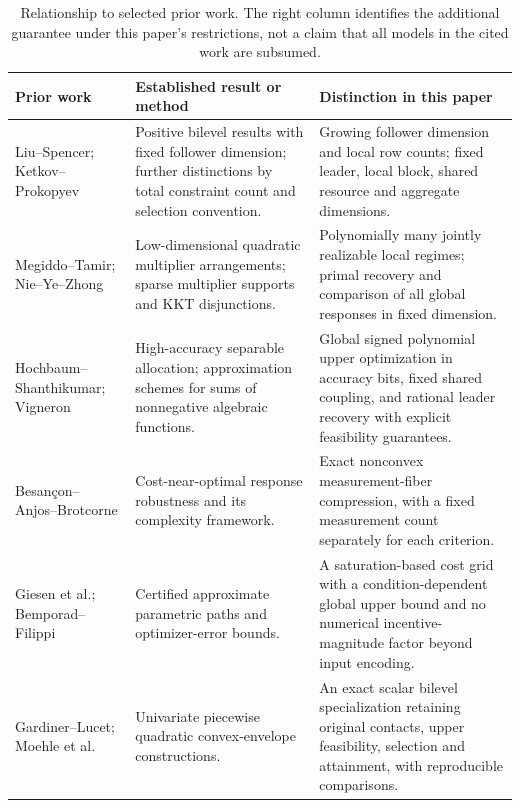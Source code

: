 \begin{table}[t]
\centering\small
\caption{Relationship to selected prior work. The right column identifies the
additional guarantee under this paper's restrictions, not a claim that all
models in the cited work are subsumed.}
\label{tab:prior-comparison}
\begin{tabular}{@{}>{\raggedright\arraybackslash}p{.23\linewidth}>{\raggedright\arraybackslash}p{.32\linewidth}>{\raggedright\arraybackslash}p{.39\linewidth}@{}}
\toprule
Prior work & Established result or method & Distinction in this paper\\\midrule
Liu--Spencer; Ketkov--Prokopyev
\cite{LiuSpencer1995,KetkovProkopyev2026} &
Positive bilevel results with fixed follower dimension; further distinctions
by total constraint count and selection convention. &
Growing follower dimension and local row counts; fixed leader, local block,
shared resource and aggregate dimensions.\\[5pt]
Megiddo--Tamir; Nie--Ye--Zhong
\cite{MegiddoTamir1993,NieYeZhong2026} &
Low-dimensional quadratic multiplier arrangements; sparse multiplier
supports and KKT disjunctions. &
Polynomially many jointly realizable local regimes; primal recovery and
comparison of all global responses in fixed dimension.\\[5pt]
Hochbaum--Shanthikumar; Vigneron
\cite{HochbaumShanthikumar1990,Vigneron2014} &
High-accuracy separable allocation; approximation schemes for sums of
nonnegative algebraic functions. &
Global signed polynomial upper optimization in accuracy bits, fixed shared
coupling, and rational leader recovery with explicit feasibility guarantees.\\[5pt]
Besan\c{c}on--Anjos--Brotcorne
\cite{BesanconAnjosBrotcorne2024,BesanconAnjosBrotcorne2021} &
Cost-near-optimal response robustness and its complexity framework. &
Exact nonconvex measurement-fiber compression, with a fixed measurement count
separately for each criterion.\\[5pt]
Giesen et al.; Bemporad--Filippi
\cite{GiesenJaggiLaue2012,GiesenEtAl2012,BemporadFilippi2001} &
Certified approximate parametric paths and optimizer-error bounds. &
A saturation-based cost grid with a condition-dependent global upper bound
and no numerical incentive-magnitude factor beyond input encoding.\\[5pt]
Gardiner--Lucet; Moehle et al.
\cite{GardinerLucet2010,MoehleEtAl2023} &
Univariate piecewise quadratic convex-envelope constructions. &
An exact scalar bilevel specialization retaining original contacts, upper
feasibility, selection and attainment, with reproducible comparisons.\\
\bottomrule
\end{tabular}
\end{table}

